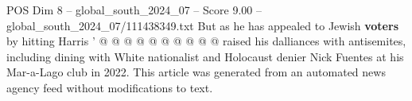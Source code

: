 \begin{textsample}{POS Dim 8 – global\_south\_2024\_07 – Score 9.00 – global\_south\_2024\_07/111438349.txt}
But as he has appealed to Jewish \textbf{voters} by hitting Harris ' @ @ @ @ @ @ @ @ @ @ raised his dalliances with antisemites, including dining with White nationalist and Holocaust denier Nick Fuentes at his Mar-a-Lago club in 2022.
This article was generated from an automated news agency feed without modifications to text.

\end{textsample}

